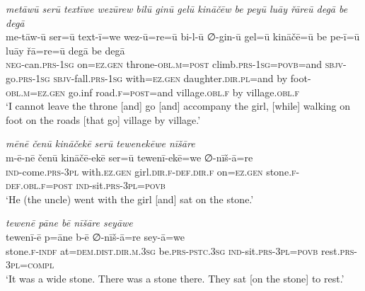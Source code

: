 \ea \label{ŽP.161}
\textit{metāwū serū textīwe wezūrew bilū ginū gelū kināčēw be peyū luāy řāreū degā be degā} \\ 
\gll me-tāw-ū ser=ū text-ī=we wez-ū=re=ū bi-l-ū ∅-gin-ū gel=ū kināčē=ū be pe-ī=ū luāy řā=re=ū degā be degā \\ 
 \textsc{neg-}can\textsc{.prs}\textsc{-\textsc{1sg}} on\textsc{\textsc{=ez.gen}} throne\textsc{-obl}\textsc{.m}\textsc{=\textsc{post}} climb\textsc{.prs}\textsc{-\textsc{1sg}}\textsc{=\textsc{povb}}=and \textsc{sbjv-}go\textsc{.prs}\textsc{-\textsc{1sg}} \textsc{sbjv-}fall\textsc{.prs}\textsc{-\textsc{1sg}} with\textsc{\textsc{=ez.gen}} daughter\textsc{.dir}\textsc{.pl}=and by foot\textsc{-obl}\textsc{.m}\textsc{\textsc{=ez.gen}} go.inf road\textsc{.f}\textsc{=\textsc{post}}=and village\textsc{.obl}\textsc{.f} by village\textsc{.obl}\textsc{.f} \\ 
\glt `I cannot leave the throne [and] go [and] accompany the girl, [while] walking on foot on the roads [that go] village by village.'
\z 
 
\ea \label{ŽP.169}
\textit{mēnē čenū kināčekē serū tewenekēwe nīšāre} \\ 
\gll m-ē-nē čenū kināčē-ekē ser=ū tewenī-ekē=we ∅-nīš-ā=re \\ 
 \textsc{ind-}come\textsc{.prs}\textsc{-3pl} with\textsc{.ez.gen} girl\textsc{.dir}\textsc{.f}\textsc{-def}\textsc{.dir}\textsc{.f} on\textsc{\textsc{=ez.gen}} stone\textsc{.f}\textsc{-def}\textsc{.obl}\textsc{.f}\textsc{=\textsc{post}} \textsc{ind-}sit\textsc{.prs}\textsc{-3pl}\textsc{=\textsc{povb}} \\ 
\glt `He (the uncle) went with the girl [and] sat on the stone.'
\z 
 
\ea \label{ŽP.171}
\textit{tewenē pāne bē nīšāre seyāwe} \\ 
\gll tewenī-ē p=āne b-ē ∅-nīš-ā=re sey-ā=we \\ 
 stone\textsc{.f}\textsc{-indf} at=\textsc{dem.dist}\textsc{.dir}\textsc{.m}\textsc{.3sg} be\textsc{.prs}\textsc{-pstc}\textsc{.3sg} \textsc{ind-}sit\textsc{.prs}\textsc{-3pl}\textsc{=\textsc{povb}} rest\textsc{.prs}\textsc{-3pl}\textsc{=compl} \\ 
\glt `It was a wide stone. There was a stone there. They sat [on the stone] to rest.'
\z 
 
